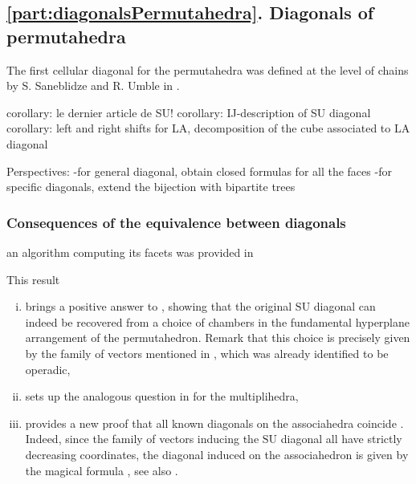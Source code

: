\documentclass{amsart}
\theoremstyle{definition}
\newcommand{\SU}{\mathrm{SU}}
\begin{document}

\subsection*{\cref{part:diagonalsPermutahedra}. Diagonals of permutahedra}

The first cellular diagonal for the permutahedra was defined at the level of chains by S. Saneblidze and R. Umble in \cite{SaneblidzeUmble}. 

corollary: le dernier article de SU!
corollary: IJ-description of SU diagonal
corollary: left and right shifts for LA, decomposition of the cube associated to LA diagonal

Perspectives: 
-for general diagonal, obtain closed formulas for all the faces
-for specific diagonals, extend the bijection with bipartite trees

\subsubsection{Consequences of the equivalence between diagonals}

an algorithm computing its facets was provided in \cite{VejdemoJohansson}

This result
\begin{enumerate}[i)]
	\item brings a positive answer to \cite[Rem.~2.19]{LaplanteAnfossi}, showing that the original $\SU$ diagonal can indeed be recovered from a choice of chambers in the fundamental hyperplane arrangement of the permutahedron. 
	Remark that this choice is precisely given by the family of vectors mentioned in \cite[Rem.~4.19]{LaplanteAnfossi}, which was already identified to be operadic,
	\item sets up the analogous question in \cite[Rem.~3.9]{LaplanteAnfossiMazuir} for the multiplihedra,
	\item provides a new proof that all known diagonals on the associahedra coincide \cite{SaneblidzeUmble-comparingDiagonals}.
	Indeed, since the family of vectors inducing the $\SU$ diagonal all have strictly decreasing coordinates, the diagonal induced on the associahedron is given by the magical formula \cite[Thm.~2]{MasudaThomasTonksVallette}, see also \cite[Prop.~3.8]{LaplanteAnfossi}.
\end{enumerate}
\end{document}
